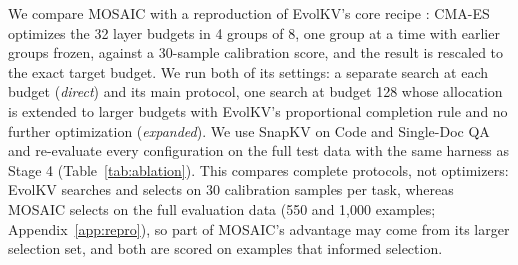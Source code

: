 \documentclass[11pt]{article}
\begin{document}
We compare MOSAIC with a reproduction of EvolKV's core recipe \citep{yu2025evolkv}: CMA-ES optimizes the 32 layer budgets in 4 groups of 8, one group at a time with earlier groups frozen, against a 30-sample calibration score, and the result is rescaled to the exact target budget. We run both of its settings: a separate search at each budget (\emph{direct}) and its main protocol, one search at budget 128 whose allocation is extended to larger budgets with EvolKV's proportional completion rule and no further optimization (\emph{expanded}). We use SnapKV on Code and Single-Doc QA and re-evaluate every configuration on the full test data with the same harness as Stage 4 (Table~\ref{tab:ablation}). This compares complete protocols, not optimizers: EvolKV searches and selects on 30 calibration samples per task, whereas MOSAIC selects on the full evaluation data (550 and 1{,}000 examples; Appendix~\ref{app:repro}), so part of MOSAIC's advantage may come from its larger selection set, and both are scored on examples that informed selection.
\end{document}
